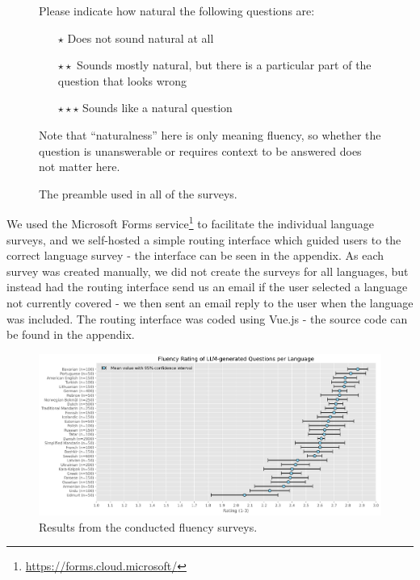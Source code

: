 \documentclass[10pt, a4paper]{article}
\begin{document}
\begin{figure}
    \begin{itshape}
        \small
        Please indicate how natural the following questions are:

        \begin{itemize}
            \item[$\star$] Does not sound natural at all
            \item[$\star\star$] Sounds mostly natural, but there is a particular part of
              the question that looks wrong
            \item[$\star\star\star$] Sounds like a natural question
        \end{itemize}

        Note that ``naturalness'' here is only meaning fluency, so whether the question
        is unanswerable or requires context to be answered does not matter here.
    \end{itshape}
    \caption{The preamble used in all of the surveys.}
    \label{fig:survey-preamble}
\end{figure}

We used the Microsoft Forms service\footnote{\url{https://forms.cloud.microsoft/}} to
facilitate the individual language surveys, and we self-hosted a simple routing
interface which guided users to the correct language survey - the interface can be seen
in the appendix. As each survey was created manually, we did not create the surveys for
all languages, but instead had the routing interface send us an email if the user
selected a language not currently covered - we then sent an email reply to the user when
the language was included. The routing interface was coded using Vue.js
\cite{you2025vuejs} - the source code can be found in the appendix.

\begin{figure}[h]
    \centering
    \includegraphics[width=1\linewidth]{fluency-rating-plot.png}
    \caption{Results from the conducted fluency surveys.}
    \label{fig:quality-evaluation-scores}
\end{figure}
\end{document}
